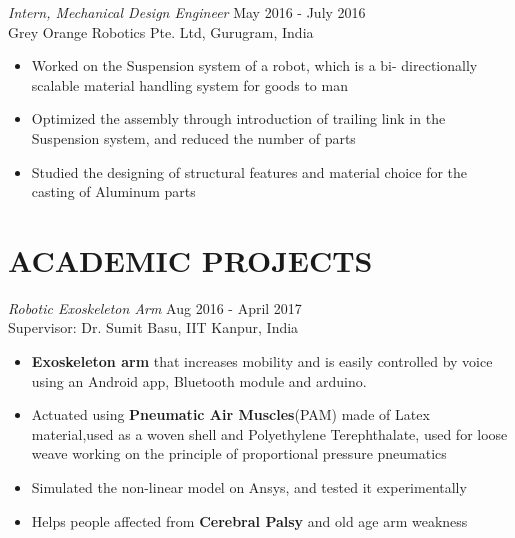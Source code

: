 \documentclass[margin, 10pt]{res} %
\begin{document}
\begin{resume}
\begin{itemize}
	
\end{itemize} 
{\sl Intern, Mechanical Design Engineer} \hfill May 2016 - July 2016 \\
Grey Orange Robotics Pte. Ltd, Gurugram, India\\

\begin{itemize}
	\item Worked on the Suspension system of a robot, which is a bi- directionally scalable material handling system for goods to man
	\item Optimized the assembly through introduction of trailing link in the Suspension system, and reduced the number of parts
	\item Studied the designing of structural features and material choice for the casting of Aluminum parts

	
\end{itemize} 
\clearpage


\section{ACADEMIC PROJECTS} 
{\sl{Robotic Exoskeleton Arm}  } \hfill Aug 2016 - April 2017 \\
Supervisor: Dr. Sumit Basu, IIT Kanpur, India\\
\begin{itemize}

\item \textbf{Exoskeleton arm} that increases mobility and is easily controlled by voice using an Android app, Bluetooth module and arduino.
\item Actuated using \textbf{Pneumatic Air Muscles}(PAM) made of Latex material,used as a woven shell and Polyethylene Terephthalate, used for loose weave working on the principle of proportional pressure  pneumatics
\item Simulated the non-linear model on Ansys, and tested it experimentally 
\item Helps people affected from \textbf{Cerebral Palsy} and old age arm weakness
\end{itemize}



\end{resume}
\end{document}
